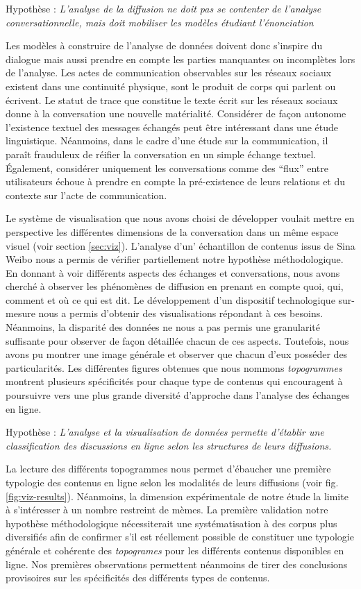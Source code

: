 Hypothèse : \textit{L'analyse de la diffusion ne doit pas se contenter de l'analyse conversationnelle, mais doit mobiliser les modèles étudiant l'énonciation} 

Les modèles à construire de l'analyse de données doivent donc s'inspire du dialogue mais aussi prendre en compte les parties manquantes ou incomplètes lors de l'analyse. Les actes de communication observables sur les réseaux sociaux existent dans une continuité physique, sont le produit de corps qui parlent ou écrivent. Le statut de trace que constitue le texte écrit sur les réseaux sociaux donne à la conversation une nouvelle matérialité. Considérer de façon autonome l'existence textuel des messages échangés peut être intéressant dans une étude linguistique. Néanmoins, dans le cadre d'une étude sur la communication, il paraît frauduleux de réifier la conversation en un simple échange textuel. Également, considérer uniquement les conversations comme des ``flux'' entre utilisateurs échoue à prendre en compte la pré-existence de leurs relations et du contexte sur l'acte de communication. 

Le système de visualisation que nous avons choisi de développer voulait mettre en perspective les différentes dimensions de la conversation dans un même espace visuel (voir section \ref{sec:viz}). L'analyse d'un' échantillon de contenus issus de Sina Weibo nous a permis de vérifier partiellement notre hypothèse méthodologique. En donnant à voir différents aspects des échanges et conversations, nous avons cherché à observer les phénomènes de diffusion en prenant en compte quoi, qui, comment et où ce qui est dit. Le développement d'un dispositif technologique sur-mesure nous a permis d'obtenir des visualisations répondant à ces besoins. Néanmoins, la disparité des données ne nous a pas permis une granularité suffisante pour observer de façon détaillée chacun de ces aspects. Toutefois, nous avons pu montrer une image générale et observer que chacun d'eux posséder des particularités. Les différentes figures obtenues que nous nommons \textit{topogrammes} montrent plusieurs spécificités pour chaque type de contenus qui encouragent à poursuivre vers une plus grande diversité d'approche dans l'analyse des échanges en ligne.

Hypothèse : \textit{L'analyse et la visualisation de données permette d'établir une classification des discussions en ligne selon les structures de leurs diffusions.}


La lecture des différents topogrammes nous permet d'ébaucher une première typologie des contenus en ligne selon les modalités de leurs diffusions (voir fig. \ref{fig:viz-results}). Néanmoins, la dimension expérimentale de notre étude la limite à s'intéresser à un nombre restreint de mèmes. La première validation notre hypothèse méthodologique nécessiterait une systématisation à des corpus plus diversifiés afin de confirmer s'il est réellement possible de constituer une typologie générale et cohérente des \textit{topogrames} pour les différents contenus disponibles en ligne. Nos premières observations permettent néanmoins de tirer des conclusions provisoires sur les spécificités des différents types de contenus.

